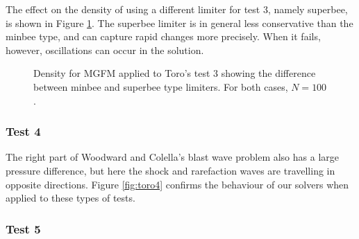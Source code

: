 \documentclass[final,3p,twocolumn]{elsarticle}
\begin{document}
The effect on the density of using a different limiter for test 3, namely
superbee, is shown in Figure \ref{fig:toro3limiters}. The superbee limiter is
in general less conservative than the minbee type, and can capture rapid
changes more precisely. When it fails, however, oscillations can occur in the
solution.


\begin{figure}[htb]
    \centering
    \caption[caption]
    {
        Density for MGFM applied to Toro's test 3 showing the difference
        between minbee and superbee type limiters.  For both cases, $N=100$.
    }
    \label{fig:toro3limiters}
\end{figure}

\subsubsection{Test 4}

The right part of Woodward and Colella's blast wave problem also has a large
pressure difference, but here the shock and rarefaction waves are travelling in
opposite directions. Figure \ref{fig:toro4} confirms the behaviour of our
solvers when applied to these types of tests. 

\subsubsection{Test 5}
\end{document}
